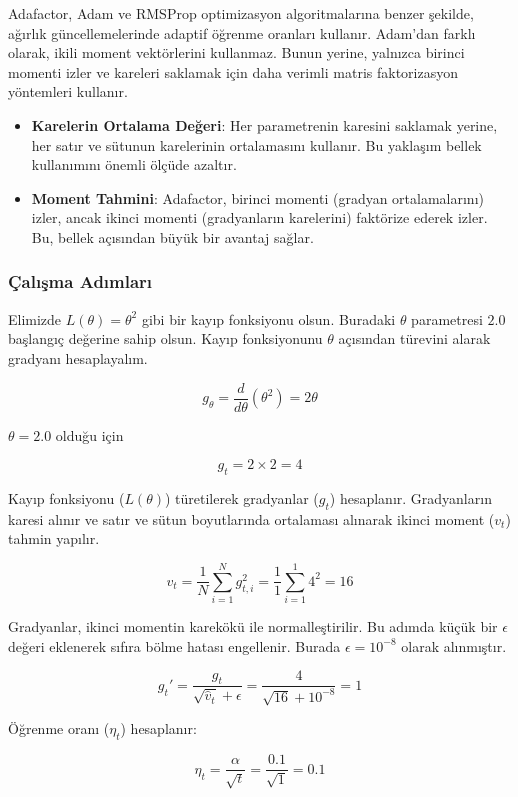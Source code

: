 Adafactor, Adam ve RMSProp optimizasyon algoritmalarına benzer şekilde, ağırlık güncellemelerinde adaptif öğrenme oranları kullanır. Adam’dan farklı olarak, ikili moment vektörlerini kullanmaz. Bunun yerine, yalnızca birinci momenti izler ve kareleri saklamak için daha verimli matris faktorizasyon yöntemleri kullanır. 

\begin{itemize}
	\item \textbf{Karelerin Ortalama Değeri}: Her parametrenin karesini saklamak yerine, her satır ve sütunun karelerinin ortalamasını kullanır. Bu yaklaşım bellek kullanımını önemli ölçüde azaltır.
	\item \textbf{Moment Tahmini}: Adafactor, birinci momenti (gradyan ortalamalarını) izler, ancak ikinci momenti (gradyanların karelerini) faktörize ederek izler. Bu, bellek açısından büyük bir avantaj sağlar.
\end{itemize}

\subsubsection{Çalışma Adımları}

Elimizde $L(\theta) = \theta^2$ gibi bir kayıp fonksiyonu olsun. Buradaki $\theta$ parametresi $2.0$ başlangıç değerine sahip olsun. Kayıp fonksiyonunu $\theta$ açısından türevini alarak gradyanı hesaplayalım.

\[ g_{\theta} = \frac{d}{d \theta} (\theta^2) = 2 \theta \]

$\theta = 2.0$ olduğu için

\[ g_t = 2 \times 2 = 4 \]

Kayıp fonksiyonu ($L(\theta)$) türetilerek gradyanlar ($g_t$) hesaplanır. Gradyanların karesi alınır ve satır ve sütun boyutlarında ortalaması alınarak ikinci moment ($v_t$) tahmin yapılır.

\[ v_t = \frac{1}{N} \sum_{i=1}^{N} g_{t,i}^2 = \frac{1}{1} \sum_{i=1}^{1} 4^2 = 16\]

Gradyanlar, ikinci momentin karekökü ile normalleştirilir. Bu adımda küçük bir $\epsilon$ değeri eklenerek sıfıra bölme hatası engellenir. Burada $\epsilon = 10^{-8}$ olarak alınmıştır.

\[ g_{t}' = \frac{g_t}{\sqrt{\hat{v}_t} + \epsilon} = \frac{4}{\sqrt{16} + 10^{-8}} = 1 \]

Öğrenme oranı ($\eta_t$) hesaplanır:

\[ \eta_t = \frac{\alpha}{\sqrt{t}} = \frac{0.1}{\sqrt{1}} = 0.1 \]

